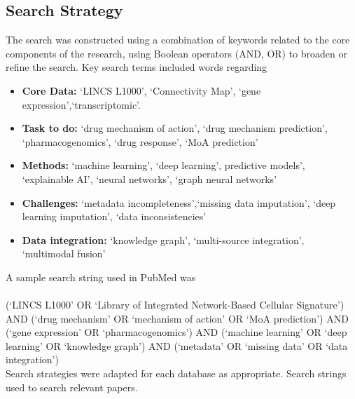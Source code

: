 \documentclass[twocolumn]{article}
\begin{document}
\subsection{Search Strategy}
The search was constructed using a combination of keywords related to the core components of the research, using Boolean operators (AND, OR) to broaden or refine the search. Key search terms included words regarding
\\
\begin{itemize}
    \item \textbf{Core Data:} `LINCS L1000', `Connectivity Map', `gene expression',`transcriptomic'.
    \item  \textbf{Task to do:} `drug mechanism of action', `drug mechanism prediction', `pharmacogenomics', `drug response', `MoA prediction'
    \item  \textbf{Methods:} `machine learning', `deep learning', predictive models', `explainable AI', `neural networks', `graph neural networks'
    \item  \textbf{Challenges:} `metadata incompleteness',`missing data imputation', `deep learning imputation', `data inconsistencies'
    \item  \textbf{Data integration:} `knowledge graph', `multi-source integration', `multimodal fusion'
\end{itemize}
A sample search string used in PubMed was\\
\\
(`LINCS L1000' OR `Library of Integrated Network-Based Cellular Signature') AND 
(`drug mechanism' OR `mechanism of action' OR `MoA prediction') AND 
(`gene expression' OR `pharmacogenomics') AND 
(`machine learning' OR `deep learning' OR `knowledge graph') AND 
(`metadata' OR `missing data' OR `data integration')
\\
Search strategies were adapted for each database as appropriate.
Search strings used to search relevant papers.
\end{document}
